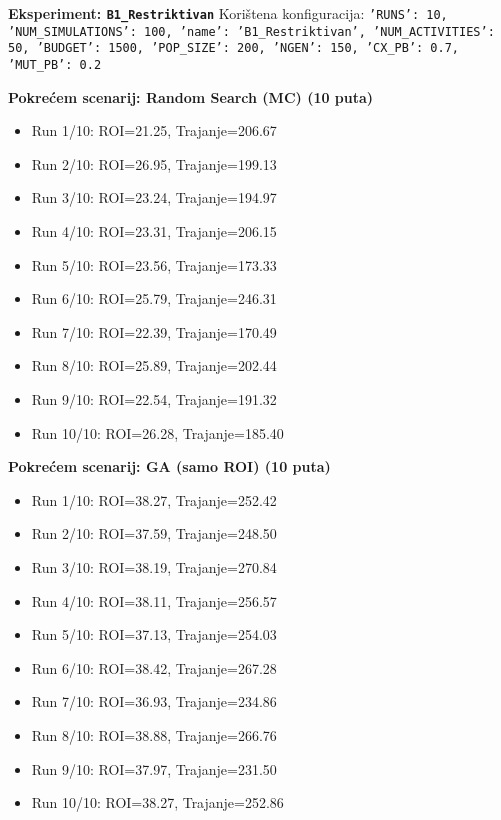 \textbf{Eksperiment: \texttt{B1\_Restriktivan}}
Korištena konfiguracija: \texttt{'RUNS': 10, 'NUM\_SIMULATIONS': 100, 'name': 'B1\_Restriktivan', 'NUM\_ACTIVITIES': 50, 'BUDGET': 1500, 'POP\_SIZE': 200, 'NGEN': 150, 'CX\_PB': 0.7, 'MUT\_PB': 0.2}

\textbf{Pokrećem scenarij: Random Search (MC) (10 puta)}
\begin{itemize}
    \item Run 1/10: ROI=21.25, Trajanje=206.67
    \item Run 2/10: ROI=26.95, Trajanje=199.13
    \item Run 3/10: ROI=23.24, Trajanje=194.97
    \item Run 4/10: ROI=23.31, Trajanje=206.15
    \item Run 5/10: ROI=23.56, Trajanje=173.33
    \item Run 6/10: ROI=25.79, Trajanje=246.31
    \item Run 7/10: ROI=22.39, Trajanje=170.49
    \item Run 8/10: ROI=25.89, Trajanje=202.44
    \item Run 9/10: ROI=22.54, Trajanje=191.32
    \item Run 10/10: ROI=26.28, Trajanje=185.40
\end{itemize}

\textbf{Pokrećem scenarij: GA (samo ROI) (10 puta)}
\begin{itemize}
    \item Run 1/10: ROI=38.27, Trajanje=252.42
    \item Run 2/10: ROI=37.59, Trajanje=248.50
    \item Run 3/10: ROI=38.19, Trajanje=270.84
    \item Run 4/10: ROI=38.11, Trajanje=256.57
    \item Run 5/10: ROI=37.13, Trajanje=254.03
    \item Run 6/10: ROI=38.42, Trajanje=267.28
    \item Run 7/10: ROI=36.93, Trajanje=234.86
    \item Run 8/10: ROI=38.88, Trajanje=266.76
    \item Run 9/10: ROI=37.97, Trajanje=231.50
    \item Run 10/10: ROI=38.27, Trajanje=252.86
\end{itemize}

